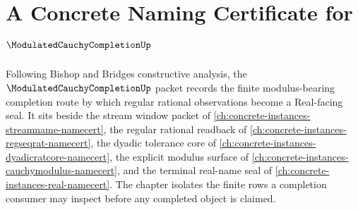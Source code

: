 \chapter{A Concrete Naming Certificate for $\ModulatedCauchyCompletionUp$}
\label{ch:concrete-instances-modulated-cauchy-completion-namecert}

Following Bishop and Bridges constructive analysis, the $\ModulatedCauchyCompletionUp$ packet records the finite modulus-bearing completion route by which regular rational observations become a Real-facing seal. It sits beside the stream window packet of \autoref{ch:concrete-instances-streamname-namecert}, the regular rational readback of \autoref{ch:concrete-instances-regseqrat-namecert}, the dyadic tolerance core of \autoref{ch:concrete-instances-dyadicratcore-namecert}, the explicit modulus surface of \autoref{ch:concrete-instances-cauchymodulus-namecert}, and the terminal real-name seal of \autoref{ch:concrete-instances-real-namecert}. The chapter isolates the finite rows a completion consumer may inspect before any completed object is claimed.

